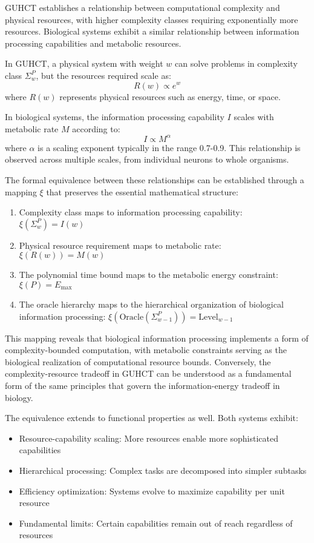 \documentclass[11pt,a4paper]{article}
\makeatletter
\renewenvironment{proof}[1][\proofname]{\par
  \pushQED{\qed}%
  \normalfont \topsep6\p@\@plus6\p@\relax
  \trivlist
  \item[\hskip\labelsep
        \itshape
    #1\@addpunct{.}]\ignorespaces
}{%
  \popQED\endtrivlist\@endpefalse
}
\makeatother
\begin{document}
\begin{proof}
GUHCT establishes a relationship between computational complexity and physical resources, with higher complexity classes requiring exponentially more resources. Biological systems exhibit a similar relationship between information processing capabilities and metabolic resources.

In GUHCT, a physical system with weight $w$ can solve problems in complexity class $\Sigma_w^P$, but the resources required scale as:
\begin{equation}
R(w) \propto e^w
\end{equation}
where $R(w)$ represents physical resources such as energy, time, or space.

In biological systems, the information processing capability $I$ scales with metabolic rate $M$ according to:
\begin{equation}
I \propto M^{\alpha}
\end{equation}
where $\alpha$ is a scaling exponent typically in the range 0.7-0.9. This relationship is observed across multiple scales, from individual neurons to whole organisms.

The formal equivalence between these relationships can be established through a mapping $\xi$ that preserves the essential mathematical structure:
\begin{enumerate}
    \item Complexity class maps to information processing capability: $\xi(\Sigma_w^P) = I(w)$
    \item Physical resource requirement maps to metabolic rate: $\xi(R(w)) = M(w)$
    \item The polynomial time bound maps to the metabolic energy constraint: $\xi(P) = E_{\text{max}}$
    \item The oracle hierarchy maps to the hierarchical organization of biological information processing: $\xi(\text{Oracle}(\Sigma_{w-1}^P)) = \text{Level}_{w-1}$
\end{enumerate}

This mapping reveals that biological information processing implements a form of complexity-bounded computation, with metabolic constraints serving as the biological realization of computational resource bounds. Conversely, the complexity-resource tradeoff in GUHCT can be understood as a fundamental form of the same principles that govern the information-energy tradeoff in biology.

The equivalence extends to functional properties as well. Both systems exhibit:
\begin{itemize}
    \item Resource-capability scaling: More resources enable more sophisticated capabilities
    \item Hierarchical processing: Complex tasks are decomposed into simpler subtasks
    \item Efficiency optimization: Systems evolve to maximize capability per unit resource
    \item Fundamental limits: Certain capabilities remain out of reach regardless of resources
\end{itemize}


\end{proof}
\end{document}
